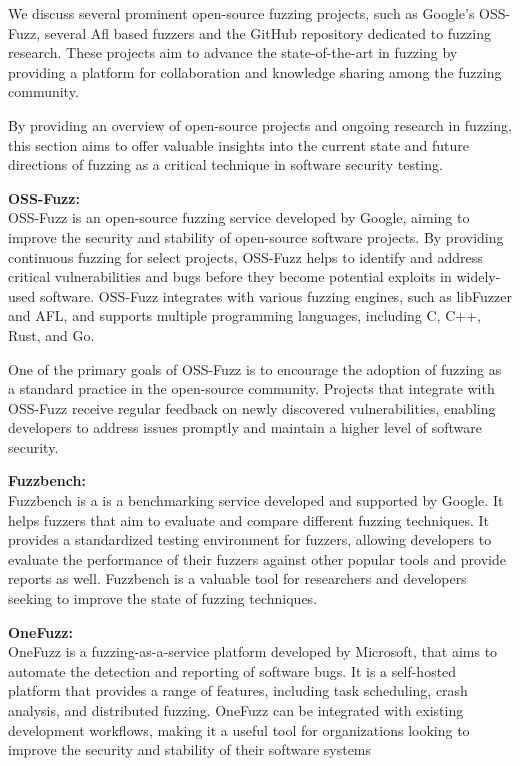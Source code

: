 We discuss several prominent open-source fuzzing projects, such as Google's
OSS-Fuzz\cite{GitHubgo49:online}, several Afl based fuzzers and the
GitHub repository dedicated to fuzzing research. These projects aim to advance the state-of-the-art
in fuzzing by providing a platform for collaboration and knowledge sharing among the fuzzing community.

By providing an overview of open-source projects and ongoing research in fuzzing,
this section aims to offer valuable insights into the current state and
future directions of fuzzing as a critical technique in software security testing.

\textbf{OSS-Fuzz:\cite{GitHubgo49:online}} \\
OSS-Fuzz is an open-source fuzzing service developed by Google, aiming to
improve the security and stability of open-source software projects.
By providing continuous fuzzing for select projects, OSS-Fuzz helps to
identify and address critical vulnerabilities and bugs before they become
potential exploits in widely-used software.
OSS-Fuzz integrates with various fuzzing engines, such as libFuzzer and AFL,
and supports multiple programming languages, including C, C++, Rust, and Go\cite{GitHubgo49:online}.

One of the primary goals of OSS-Fuzz is to encourage the adoption of fuzzing as
a standard practice in the open-source community. Projects that integrate with
OSS-Fuzz receive regular feedback on newly discovered vulnerabilities,
enabling developers to address issues promptly and maintain a higher
level of software security\cite{GitHubgo49:online}.

\textbf{Fuzzbench: \cite{GitHubgo32:online}}\\
Fuzzbench is a is a benchmarking service developed and supported by Google. It helps
fuzzers that aim to evaluate and compare different fuzzing techniques. It
provides a standardized testing environment for fuzzers,
allowing developers to evaluate the performance of their fuzzers
against other popular tools and provide reports as well\cite{FuzzBenc32:online}.
Fuzzbench is a valuable tool for researchers and developers seeking to improve
the state of fuzzing techniques.


\textbf{OneFuzz: \cite{GitHubmi60:online}}\\
OneFuzz is a fuzzing-as-a-service platform developed by Microsoft, that aims to
automate the detection and reporting of software bugs. It is a self-hosted
platform that provides a range of features, including task scheduling,
crash analysis, and distributed fuzzing. OneFuzz can be integrated with
existing development workflows, making it a useful tool for organizations
looking to improve the security and stability of their software systems


